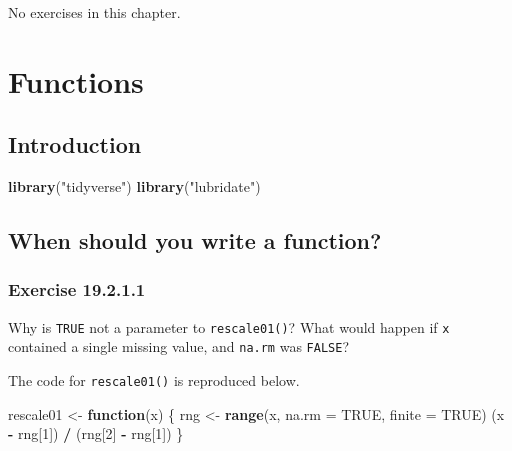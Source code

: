 \documentclass[]{book}
\newenvironment{Shaded}{\begin{snugshade}}{\end{snugshade}}
\newcommand{\ControlFlowTok}[1]{\textcolor[rgb]{0.13,0.29,0.53}{\textbf{#1}}}
\newcommand{\DataTypeTok}[1]{\textcolor[rgb]{0.13,0.29,0.53}{#1}}
\newcommand{\DecValTok}[1]{\textcolor[rgb]{0.00,0.00,0.81}{#1}}
\newcommand{\KeywordTok}[1]{\textcolor[rgb]{0.13,0.29,0.53}{\textbf{#1}}}
\newcommand{\NormalTok}[1]{#1}
\newcommand{\OperatorTok}[1]{\textcolor[rgb]{0.81,0.36,0.00}{\textbf{#1}}}
\newcommand{\OtherTok}[1]{\textcolor[rgb]{0.56,0.35,0.01}{#1}}
\newcommand{\StringTok}[1]{\textcolor[rgb]{0.31,0.60,0.02}{#1}}
\theoremstyle{plain}
\theoremstyle{remark}
\begin{document}
No exercises in this chapter.

\hypertarget{functions}{%
\chapter{Functions}\label{functions}}

\hypertarget{introduction-12}{%
\section{Introduction}\label{introduction-12}}

\begin{Shaded}
\begin{Highlighting}[]
\KeywordTok{library}\NormalTok{(}\StringTok{"tidyverse"}\NormalTok{)}
\KeywordTok{library}\NormalTok{(}\StringTok{"lubridate"}\NormalTok{)}
\end{Highlighting}
\end{Shaded}

\hypertarget{when-should-you-write-a-function}{%
\section{When should you write a
function?}\label{when-should-you-write-a-function}}

\hypertarget{exercise-19.2.1.1}{%
\subsection*{\texorpdfstring{Exercise
{19.2.1.1}}{Exercise 19.2.1.1}}\label{exercise-19.2.1.1}}

Why is \texttt{TRUE} not a parameter to \texttt{rescale01()}? What would
happen if \texttt{x} contained a single missing value, and
\texttt{na.rm} was \texttt{FALSE}?

The code for \texttt{rescale01()} is reproduced below.

\begin{Shaded}
\begin{Highlighting}[]
\NormalTok{rescale01 <-}\StringTok{ }\ControlFlowTok{function}\NormalTok{(x) \{}
\NormalTok{  rng <-}\StringTok{ }\KeywordTok{range}\NormalTok{(x, }\DataTypeTok{na.rm =} \OtherTok{TRUE}\NormalTok{, }\DataTypeTok{finite =} \OtherTok{TRUE}\NormalTok{)}
\NormalTok{  (x }\OperatorTok{-}\StringTok{ }\NormalTok{rng[}\DecValTok{1}\NormalTok{]) }\OperatorTok{/}\StringTok{ }\NormalTok{(rng[}\DecValTok{2}\NormalTok{] }\OperatorTok{-}\StringTok{ }\NormalTok{rng[}\DecValTok{1}\NormalTok{])}
\NormalTok{\}}
\end{Highlighting}
\end{Shaded}
\end{document}
